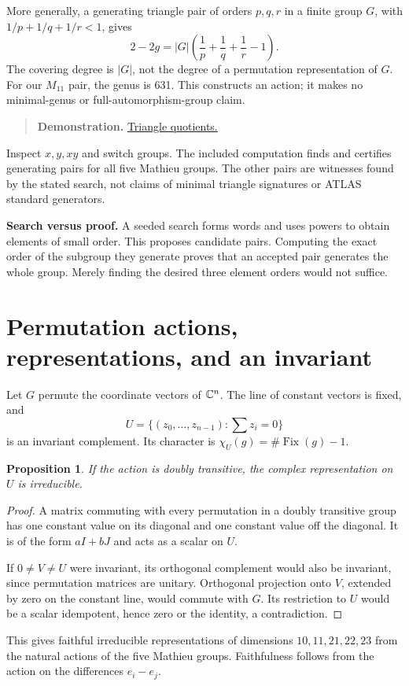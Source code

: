 \documentclass[12pt,letterpaper]{article}
\newtheorem{proposition}[theorem]{Proposition}
\theoremstyle{definition}
\theoremstyle{remark}
\newenvironment{toolnote}{\begin{quote}\small\color{navy}}{\end{quote}}
\newcommand{\pageheading}[1]{\clearpage\section{#1}}
\newcommand{\demolink}[2]{\href{https://gtevelev-max.github.io/mathieu/\##1}{#2}}
\newcommand{\demobox}[2]{\begin{toolnote}\textbf{Demonstration.} \demolink{#1}{#2}\end{toolnote}}
\begin{document}
More generally, a generating triangle pair of orders $p,q,r$ in a finite group $G$, with $1/p+1/q+1/r<1$, gives
\[
 2-2g=|G|\left(\frac1p+\frac1q+\frac1r-1\right).
\]
The covering degree is $|G|$, not the degree of a permutation representation of $G$. For our $M_{11}$ pair, the genus is 631. This constructs an action; it makes no minimal-genus or full-automorphism-group claim.

\demobox{triangles?group=11}{Triangle quotients.} Inspect $x,y,xy$ and switch groups. The included computation finds and certifies generating pairs for all five Mathieu groups. The other pairs are witnesses found by the stated search, not claims of minimal triangle signatures or ATLAS standard generators.

\textbf{Search versus proof.} A seeded search forms words and uses powers to obtain elements of small order. This proposes candidate pairs. Computing the exact order of the subgroup they generate proves that an accepted pair generates the whole group. Merely finding the desired three element orders would not suffice.

\hypertarget{representations}{}
\pageheading{Permutation actions, representations, and an invariant}
Let $G$ permute the coordinate vectors of $\mathbb C^n$. The line of constant vectors is fixed, and
\[
 U=\{(z_0,\ldots,z_{n-1}):\textstyle\sum z_i=0\}
\]
is an invariant complement. Its character is $\chi_U(g)=\#\operatorname{Fix}(g)-1$.

\begin{proposition}
If the action is doubly transitive, the complex representation on $U$ is irreducible.
\end{proposition}
\begin{proof}
A matrix commuting with every permutation in a doubly transitive group has one constant value on its diagonal and one constant value off the diagonal. It is of the form $aI+bJ$ and acts as a scalar on $U$.

If $0\ne V\ne U$ were invariant, its orthogonal complement would also be invariant, since permutation matrices are unitary. Orthogonal projection onto $V$, extended by zero on the constant line, would commute with $G$. Its restriction to $U$ would be a scalar idempotent, hence zero or the identity, a contradiction.
\end{proof}
This gives faithful irreducible representations of dimensions $10,11,21,22,23$ from the natural actions of the five Mathieu groups. Faithfulness follows from the action on the differences $e_i-e_j$.
\end{document}
